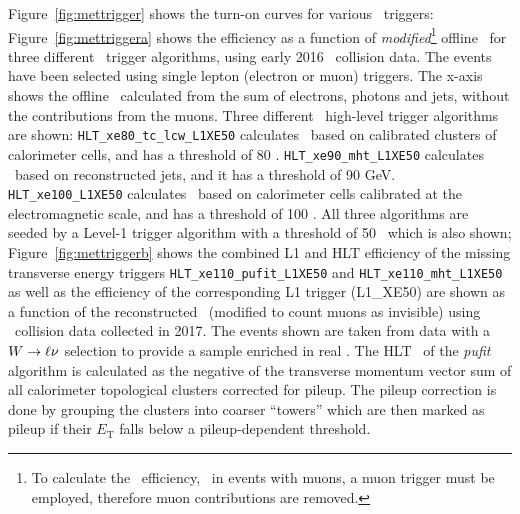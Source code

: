 				Figure~\ref{fig:mettrigger} shows the turn-on curves for various \met\ triggers: Figure~\ref{fig:mettriggera} shows the efficiency as a function of \textit{modified}\footnote{To calculate the \met\ efficiency, \eg\ in events with muons, a muon trigger must be employed, therefore muon contributions are removed.} offline \met\ for three different \met\ trigger algorithms, using early 2016 \pp\ collision data. The events have been selected using single lepton (electron or muon) triggers. The x-axis shows the offline \met\ calculated from the sum of electrons, photons and jets, without the contributions from the muons. Three different \met\ high-level trigger algorithms are shown: \texttt{HLT\_xe80\_tc\_lcw\_L1XE50} calculates \met\ based on calibrated clusters of calorimeter cells, and has a threshold of 80 \GeV. \texttt{HLT\_xe90\_mht\_L1XE50} calculates \met\ based on reconstructed jets, and it has a threshold of 90 GeV. \texttt{HLT\_xe100\_L1XE50} calculates \met\ based on calorimeter cells calibrated at the electromagnetic scale, and has a threshold of 100 \GeV. All three algorithms are seeded by a Level-1 trigger algorithm with a threshold of 50 \GeV\ which is also shown; Figure~\ref{fig:mettriggerb} shows the combined \ac{L1} and \ac{HLT} efficiency of the missing transverse energy triggers \texttt{HLT\_xe110\_pufit\_L1XE50} and \texttt{HLT\_xe110\_mht\_L1XE50} as well as the efficiency of the corresponding \ac{L1} trigger (L1\_XE50) are shown as a function of the reconstructed \met\ (modified to count muons as invisible) using \pp\ collision data collected in 2017. The events shown are taken from data with a $W \rightarrow \ell \nu$ selection to provide a sample enriched in real \met. The \ac{HLT} \met\ of the \textit{pufit} algorithm is calculated as the negative of the transverse momentum vector sum of all calorimeter topological clusters corrected for pileup. The pileup correction is done by grouping the clusters into coarser “towers” which are then marked as pileup if their $E_\mathrm{T}$ falls below a pileup-dependent threshold.

